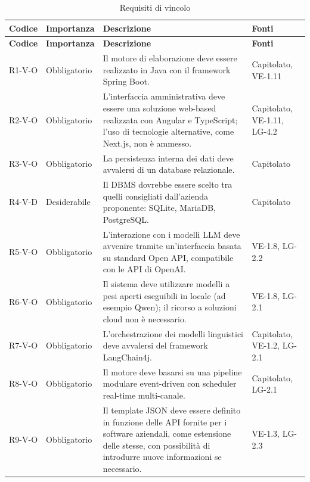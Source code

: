 {
    \small
    \renewcommand{\arraystretch}{1.3}
    \begin{longtable}{|>{\raggedright\arraybackslash}p{1.8cm}|>{\raggedright\arraybackslash}p{2.3cm}|>{\raggedright\arraybackslash}p{6.6cm}|>{\raggedright\arraybackslash}p{3.1cm}|}
    \caption{Requisiti di vincolo}\label{tab:req-vincolo}\\
    \hline
    \rowcolor[gray]{0.88} \textbf{Codice} & \textbf{Importanza} & \textbf{Descrizione} & \textbf{Fonti} \\ \hline
    \endfirsthead
    \hline
    \rowcolor[gray]{0.88} \textbf{Codice} & \textbf{Importanza} & \textbf{Descrizione} & \textbf{Fonti} \\ \hline
    \endhead
    \mbox{R1-V-O} & Obbligatorio & Il motore di elaborazione deve essere realizzato in Java con il framework Spring Boot. & \mbox{Capitolato}, \mbox{VE-1.11} \\ \hline
    \mbox{R2-V-O} & Obbligatorio & L'interfaccia amministrativa deve essere una soluzione web-based realizzata con Angular e TypeScript; l'uso di tecnologie alternative, come Next.js, non è ammesso. & \mbox{Capitolato}, \mbox{VE-1.11}, \mbox{LG-4.2} \\ \hline
    \mbox{R3-V-O} & Obbligatorio & La persistenza interna dei dati deve avvalersi di un database relazionale. & \mbox{Capitolato} \\ \hline
    \mbox{R4-V-D} & Desiderabile & Il DBMS dovrebbe essere scelto tra quelli consigliati dall'azienda proponente: SQLite, MariaDB, PostgreSQL. & \mbox{Capitolato} \\ \hline
    \mbox{R5-V-O} & Obbligatorio & L'interazione con i modelli LLM deve avvenire tramite un'interfaccia basata su standard Open API, compatibile con le API di OpenAI. & \mbox{VE-1.8}, \mbox{LG-2.2} \\ \hline
    \mbox{R6-V-O} & Obbligatorio & Il sistema deve utilizzare modelli a pesi aperti eseguibili in locale (ad esempio Qwen); il ricorso a soluzioni cloud non è necessario. & \mbox{VE-1.8}, \mbox{LG-2.1} \\ \hline
    \mbox{R7-V-O} & Obbligatorio & L'orchestrazione dei modelli linguistici deve avvalersi del framework LangChain4j. & \mbox{Capitolato}, \mbox{VE-1.2}, \mbox{LG-2.1} \\ \hline
    \mbox{R8-V-O} & Obbligatorio & Il motore deve basarsi su una pipeline modulare event-driven con scheduler real-time multi-canale. & \mbox{Capitolato}, \mbox{LG-2.1} \\ \hline
    \mbox{R9-V-O} & Obbligatorio & Il template JSON deve essere definito in funzione delle API fornite per i software aziendali, come estensione delle stesse, con possibilità di introdurre nuove informazioni se necessario. & \mbox{VE-1.3}, \mbox{LG-2.3} \\ \hline

\end{longtable}}
